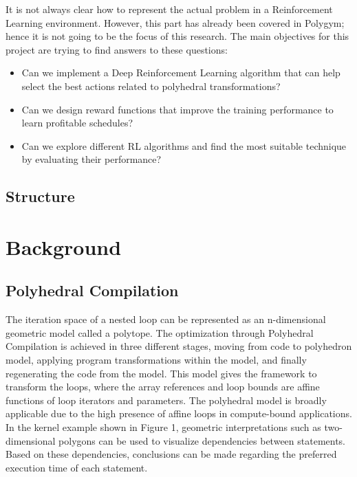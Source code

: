 \documentclass[logo,msc]{infthesis}           %
\begin{document}
It is not always clear how to represent the actual problem in a Reinforcement Learning environment. However, this part has already been covered in Polygym\cite{9563041}; hence it is not going to be the focus of this research. The main objectives for this project are trying to find answers to these questions:
\begin{itemize}

    \item Can we implement a Deep Reinforcement Learning algorithm that can help select the best actions related to polyhedral transformations? 
    \item Can we design reward functions that improve the training performance to learn profitable schedules?
    \item Can we explore different RL algorithms and find the most suitable technique by evaluating their performance?


\end{itemize}

\section{Structure}

\chapter{Background}

\section{Polyhedral Compilation}

The iteration space of a nested loop can be represented as an n-dimensional geometric model called a polytope. The optimization through Polyhedral Compilation is achieved in three different stages, moving from code to polyhedron model, applying program transformations within the model, and finally regenerating the code from the model. This model gives the framework to transform the loops, where the array references and loop bounds are affine functions of loop iterators and parameters. The polyhedral model is broadly applicable due to the high presence of affine loops in compute-bound applications\cite{poly_applicable}. In the kernel example shown in Figure 1, geometric interpretations such as two-dimensional polygons can be used to visualize dependencies between statements. Based on these dependencies, conclusions can be made regarding the preferred execution time of each statement. 
\end{document}
